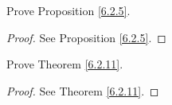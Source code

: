 \exercisesection

\begin{exercise}\label{ex 6.2.1}
Prove Proposition \ref{6.2.5}.
\end{exercise}

\begin{proof}
See Proposition \ref{6.2.5}.
\end{proof}

\begin{exercise}\label{ex 6.2.2}
Prove Theorem \ref{6.2.11}.
\end{exercise}

\begin{proof}
See Theorem \ref{6.2.11}.
\end{proof}